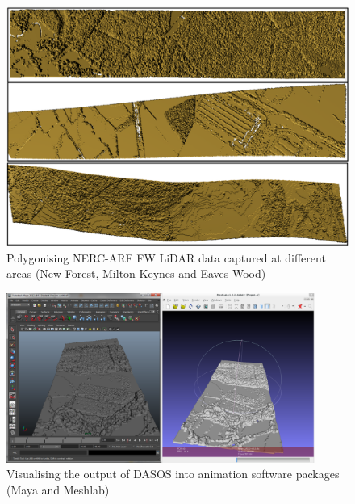 \documentclass{subfiles}
\begin{document}
  \begin{figure} [h!]
  	\centering
  	\includegraphics[width=.8\textwidth]{img/VariousFlightlines}
  	\caption[Various Flightlines Visualisation]{Polygonising NERC-ARF FW LiDAR data captured at different areas (New Forest, Milton Keynes and Eaves Wood)}
  	\label{fig:VariousFlightlines}
  \end{figure}
  
    \begin{figure} [h!]
    	\centering
    	\includegraphics[width=0.9\textwidth]{img/AimationPackages.png}
    	\caption[Animation Packages]{Visualising the output of DASOS into animation software packages (Maya and Meshlab)}
    	\label{fig:AnimationPackages}
    \end{figure}
 
\end{document}
